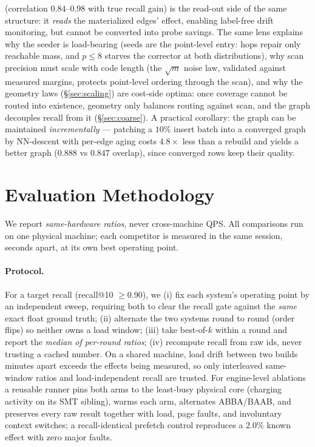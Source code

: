 \documentclass{article}
\begin{document}
(correlation $0.84$--$0.98$ with true recall gain) is the read-out side of the same
structure: it \emph{reads} the materialized edges' effect, enabling label-free drift
monitoring, but cannot be converted into probe savings. The same lens explains why
the seeder is load-bearing (seeds are the point-level entry: hops repair only
reachable mass, and $p\!\le\!8$ starves the corrector at both distributions), why scan
precision must scale with code length (the $\sqrt{m}$ noise law, validated against
measured margins, protects point-level ordering through the scan), and why the
geometry laws (\S\ref{sec:scaling}) are cost-side optima: once coverage cannot be
routed into existence, geometry only balances routing against scan, and the graph
decouples recall from it (\S\ref{sec:coarse}). A practical corollary: the graph can be
maintained \emph{incrementally} --- patching a $10\%$ insert batch into a converged
graph by NN-descent with per-edge aging costs $4.8\times$ less than a rebuild and
yields a better graph ($0.888$ vs $0.847$ overlap), since converged rows keep their
quality.

\section{Evaluation Methodology}
\label{sec:method}
We report \emph{same-hardware ratios}, never cross-machine QPS. All comparisons run
on one physical machine; each competitor is measured in the same session, seconds
apart, at its own best operating point.

\paragraph{Protocol.} For a target recall (recall@10 $\ge 0.90$), we (i) fix each
system's operating point by an independent sweep, requiring both to clear the recall
gate against the \emph{same} exact float ground truth; (ii) alternate the two systems
round to round (order flips) so neither owns a load window; (iii) take best-of-$k$
within a round and report the \emph{median of per-round ratios}; (iv) recompute
recall from raw ids, never trusting a cached number. On a shared machine, load drift
between two builds minutes apart exceeds the effects being measured, so only
interleaved same-window ratios and load-independent recall are trusted.
For engine-level ablations a reusable runner pins both arms to the least-busy physical
core (charging activity on its SMT sibling), warms each arm, alternates
ABBA/BAAB, and preserves every raw result together with load, page faults, and
involuntary context switches; a recall-identical prefetch control reproduces a
$2.0\%$ known effect with zero major faults.
\end{document}

